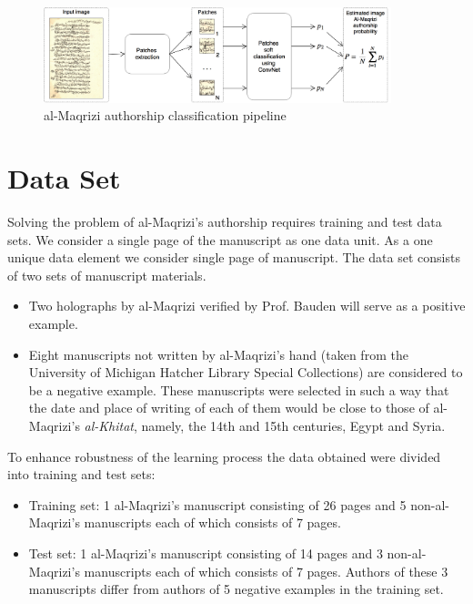 \documentclass[conference,a4paper]{ieeetran}
\begin{document}
\begin{figure}[!t]
	\center
  \includegraphics[width=0.9\textwidth]{figures/Al-Maqrizi_classification_pipeline.png}
  \caption{al-Maqrizi authorship classification pipeline}
  \label{fig:pipeline}
\end{figure}	
	
\section{Data Set}
\label{sec:the_data}

Solving the problem of al-Maqrizi's authorship requires training and test data sets. 
We consider a single page of the manuscript as one data unit.
As a one unique data element we consider single page of manuscript. The data set consists of two sets of manuscript materials.
\begin{itemize}
	\item Two holographs by al-Maqrizi verified by Prof. Bauden will serve as a positive example.
	\item Eight manuscripts not written by al-Maqrizi's hand  (taken from the University of Michigan Hatcher Library Special Collections) are considered to be a negative example. These manuscripts were selected in such a way that the date and place of writing of each of them would be close to those of al-Maqrizi's  \textit{al-Khitat}, namely, the 14th and 15th centuries, Egypt and Syria.
\end{itemize}

To enhance robustness of the learning process the data obtained were divided into training and test sets:
\begin{itemize}
	\item Training set: 1 al-Maqrizi's manuscript consisting of 26 pages and 5 non-al-Maqrizi's manuscripts each of which consists of 7 pages.
	\item Test set: 1 al-Maqrizi's manuscript consisting of 14 pages and 3 non-al-Maqrizi's manuscripts each of which consists of 7 pages. Authors of these 3 manuscripts differ from authors of 5 negative examples in the training set.   
\end{itemize}
\end{document}
